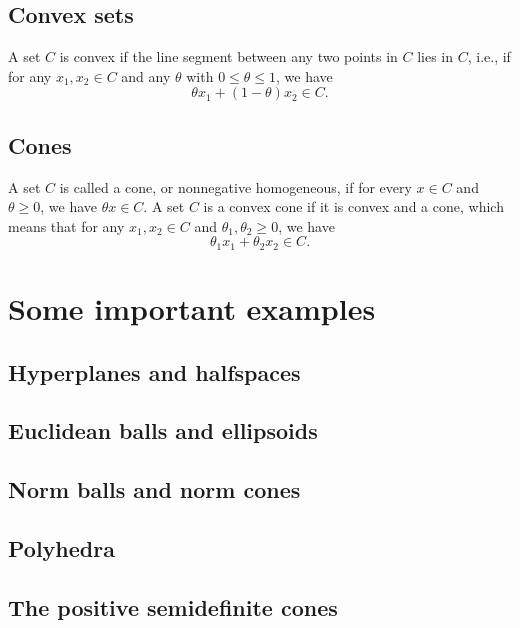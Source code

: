 \documentclass[11pt,oneside,a4paper]{book}
\theoremstyle{definition}
\DeclareRobustCommand{\[}{\begin{equation}}
\DeclareRobustCommand{\]}{\end{equation}}
\begin{document}
\subsection{Convex sets}

A set $ C $ is convex if the line segment between any two points in $ C $ lies in $ C $, i.e., if for any $ x_1,x_2\in C $ and any $ \theta $ with $ 0\leq\theta\leq1 $, we have
\begin{equation*}
\theta x_1+(1-\theta)x_2\in C.
\end{equation*}

\subsection{Cones}

A set $ C $ is called a cone, or nonnegative homogeneous, if for every $ x\in C $ and $ \theta\geq 0 $, we have $ \theta x\in C $. A set $ C $ is a convex cone if it is convex and a cone, which means that for any $ x_1,x_2\in C $ and $ \theta_1,\theta_2\geq 0 $, we have
\begin{equation*}
\theta_1 x_1+\theta_2 x_2\in C.
\end{equation*}


\section{Some important examples}

\subsection{Hyperplanes and halfspaces}

\subsection{Euclidean balls and ellipsoids}

\subsection{Norm balls and norm cones}

\subsection{Polyhedra}

\subsection{The positive semidefinite cones}
\end{document}
